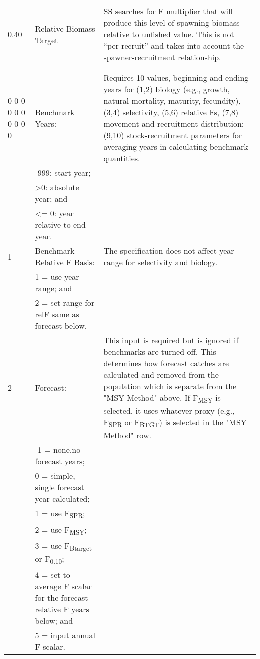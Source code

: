 \begin{landscape}
{\begin{longtable}{p{3.2cm} p{7cm} p{10.8cm}}
 \hline
 0.40 & Relative Biomass Target & \multirow{1}{1cm}[-0.25cm]{\parbox{11cm }{ SS searches for F multiplier that will produce this level of spawning biomass relative to unfished value.  This is not “per recruit” and takes into account the spawner-recruitment relationship.}} \Tstrut\\
      & & \Bstrut\\
      & & \Bstrut\\
  
 \hline
 0 0 0 0 0 0 0 0 0 0 & Benchmark Years: & \multirow{1}{1cm}[-0.25cm]{\parbox{11cm }{ Requires 10 values, beginning and ending years for (1,2) biology (e.g., growth, natural mortality, maturity, fecundity), (3,4) selectivity, (5,6) relative Fs, (7,8) movement and recruitment distribution; (9,10) stock-recruitment parameters for averaging years in calculating benchmark quantities.}} \Tstrut\\
  & -999: start year; & \\
  & >0:   absolute year; and & \\
  & <= 0: year relative to end year. & \\


  \pagebreak
  1 & Benchmark Relative F Basis: &  \multirow{1}{1cm}[-0.25cm]{\parbox{11cm }{ The specification does not affect year range for selectivity and biology.}} \Tstrut\\
    & 1 = use year range; and & \\
    & 2 = set range for relF same as forecast below. & \\
    
  \hline
  2 & Forecast: & \multirow{1}{1cm}[-0.25cm]{\parbox{11cm }{ This input is required but is ignored if benchmarks are turned off.  This determines how forecast catches are calculated and removed from the population which is separate from the "MSY Method" above. If F\textsubscript{MSY} is selected, it uses whatever proxy (e.g., F\textsubscript{SPR} or F\textsubscript{BTGT}) is selected in the "MSY Method" row.}} \Tstrut\\
    & -1 = none,no forecast years; & \\
    & 0 = simple, single forecast year calculated; & \\
    & 1 = use F\textsubscript{SPR}; & \\
    & 2 = use F\textsubscript{MSY}; & \\
    & 3 = use F\textsubscript{Btarget} or F\textsubscript{0.10}; & \\
    & 4 = set to average F scalar for the forecast relative F years below; and & \\
    & 5 = input annual F scalar. & \Bstrut\\
    

\end{longtable}}
\end{landscape}
